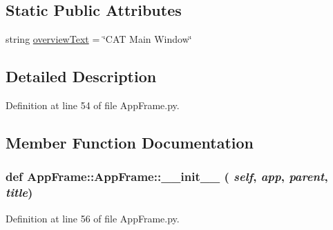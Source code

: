 \subsection*{Static Public Attributes}
\begin{DoxyCompactItemize}
\item 
string \hyperlink{classAppFrame_1_1AppFrame_a667d35fae1ebfa2706cfbb31fdf0cbab}{overviewText} = \char`\"{}CAT Main Window\char`\"{}
\end{DoxyCompactItemize}


\subsection{Detailed Description}


Definition at line 54 of file AppFrame.py.

\subsection{Member Function Documentation}
\hypertarget{classAppFrame_1_1AppFrame_a99de512a9c17c41f6446a0ad51aa492f}{
\subsubsection[{\_\-\_\-init\_\-\_\-}]{\setlength{\rightskip}{0pt plus 5cm}def AppFrame::AppFrame::\_\-\_\-init\_\-\_\- ( {\em self}, \/   {\em app}, \/   {\em parent}, \/   {\em title})}}
\label{classAppFrame_1_1AppFrame_a99de512a9c17c41f6446a0ad51aa492f}


Definition at line 56 of file AppFrame.py.


